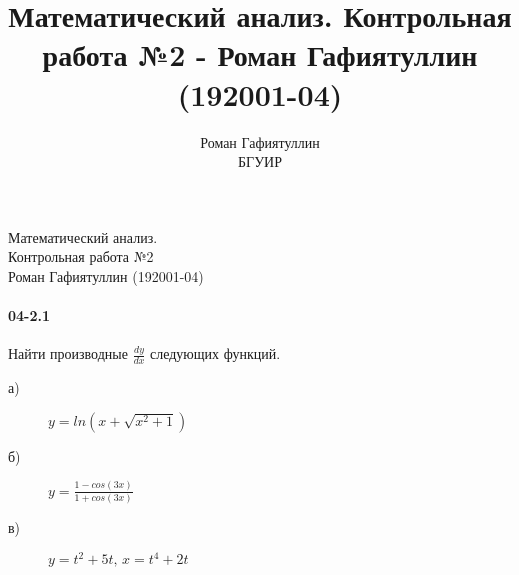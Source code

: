 \documentclass[12pt]{article}
\title{Математический анализ. Контрольная работа №2 - Роман Гафиятуллин (192001-04)}
\author{Роман Гафиятуллин\\ БГУИР}
\begin{document}
	\begin{titlepage}
		\begin{center}
			{\Large Математический анализ. \\ Контрольная работа №2 \\ Роман Гафиятуллин (192001-04)}
		\end{center}
	\end{titlepage}
	\clearpage
	\paragraph{04-2.1} Найти производные \ensuremath{\frac{dy}{dx}} следующих функций. \\
	\begin{description}
		\item[а)]
			\ensuremath{
				y = ln( x + \sqrt{x^2 + 1} )
			}
		\item[б)]
			\ensuremath{
				y = \frac
					{1 - cos(3x)}
					{1 + cos(3x)}
			}
		\item[в)]
			\ensuremath{
				y = t^2 + 5t,\,x = t^4 + 2t
			}

	\end{description}
\end{document}
